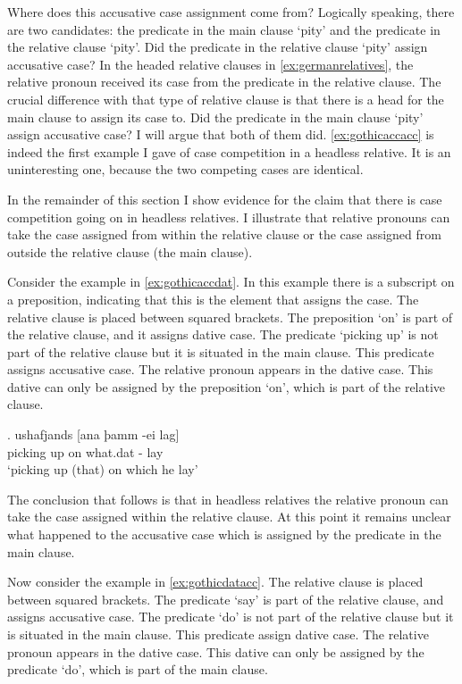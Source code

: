 Where does this accusative case assignment come from? Logically speaking, there are two candidates: the predicate in the main clause  `pity' and the predicate in the relative clause  `pity'. Did the predicate in the relative clause  `pity' assign accusative case? In the headed relative clauses in \ref{ex:germanrelatives}, the relative pronoun received its case from the predicate in the relative clause. The crucial difference with that type of relative clause is that there is a head for the main clause to assign its case to. Did the predicate in the main clause  `pity' assign accusative case? I will argue that both of them did. \ref{ex:gothicaccacc} is indeed the first example I gave of case competition in a headless relative. It is an uninteresting one, because the two competing cases are identical.

In the remainder of this section I show evidence for the claim that there is case competition going on in headless relatives. I illustrate that relative pronouns can take the case assigned from within the relative clause or the case assigned from outside the relative clause (the main clause).

Consider the example in \ref{ex:gothicaccdat}. In this example there is a subscript on a preposition, indicating that this is the element that assigns the case. The relative clause is placed between squared brackets. The preposition  `on' is part of the relative clause, and it assigns dative case. The predicate  `picking up' is not part of the relative clause but it is situated in the main clause. This predicate assigns accusative case. The relative pronoun  appears in the dative case. This dative can only be assigned by the preposition  `on', which is part of the relative clause.

\exg. ushafjands [ana þamm -ei lag]\\
 {picking up}\scsub{[acc]} on\scsub{[dat]} what.\ac{dat} - lay\\
 `picking up (that) on which he lay' \label{ex:gothicaccdat}

The conclusion that follows is that in headless relatives the relative pronoun can take the case assigned within the relative clause. At this point it remains unclear what happened to the accusative case which is assigned by the predicate in the main clause.

Now consider the example in \ref{ex:gothicdatacc}. The relative clause is placed between squared brackets. The predicate  `say' is part of the relative clause, and assigns accusative case. The predicate  `do' is not part of the relative clause but it is situated in the main clause. This predicate assign dative case. The relative pronoun  appears in the dative case. This dative can only be assigned by the predicate  `do', which is part of the main clause.

